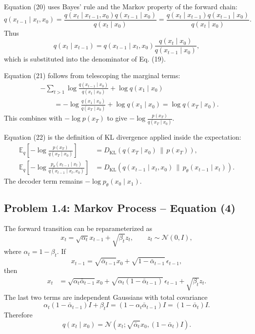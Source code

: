 \documentclass[11pt]{article}
\newcommand{\E}{\mathbb{E}}
\newcommand{\N}{\mathcal{N}}
\newcommand{\KL}{D_{\mathrm{KL}}}
\newcommand{\Id}{I}
\begin{document}
Equation (20) uses Bayes' rule and the Markov property of the forward chain:
\[
q(x_{t-1}\mid x_t,x_0)
=\frac{q(x_t\mid x_{t-1},x_0)q(x_{t-1}\mid x_0)}{q(x_t\mid x_0)}
=\frac{q(x_t\mid x_{t-1})q(x_{t-1}\mid x_0)}{q(x_t\mid x_0)}.
\]
Thus
\[
q(x_t\mid x_{t-1})
=q(x_{t-1}\mid x_t,x_0)\frac{q(x_t\mid x_0)}{q(x_{t-1}\mid x_0)},
\]
which is substituted into the denominator of Eq. (19).

Equation (21) follows from telescoping the marginal terms:
\begin{align*}
&-\sum_{t>1}\log \frac{q(x_{t-1}\mid x_0)}{q(x_t\mid x_0)}
+\log q(x_1\mid x_0) \\
&\qquad
=-\log\frac{q(x_1\mid x_0)}{q(x_T\mid x_0)}
+\log q(x_1\mid x_0)
=\log q(x_T\mid x_0).
\end{align*}
This combines with $-\log p(x_T)$ to give $-\log \frac{p(x_T)}{q(x_T\mid x_0)}$.

Equation (22) is the definition of KL divergence applied inside the expectation:
\begin{align*}
\E_q\left[-\log \frac{p(x_T)}{q(x_T\mid x_0)}\right]
&= \KL(q(x_T\mid x_0)\,\|\,p(x_T)),\\
\E_q\left[-\log
\frac{p_\theta(x_{t-1}\mid x_t)}
{q(x_{t-1}\mid x_t,x_0)}\right]
&= \KL(q(x_{t-1}\mid x_t,x_0)\,\|\,p_\theta(x_{t-1}\mid x_t)).
\end{align*}
The decoder term remains $-\log p_\theta(x_0\mid x_1)$.

\subsection*{Problem 1.4: Markov Process -- Equation (4)}
The forward transition can be reparameterized as
\[
x_t=\sqrt{\alpha_t}x_{t-1}+\sqrt{\beta_t}z_t,\qquad z_t\sim\N(0,\Id),
\]
where $\alpha_t=1-\beta_t$.  If
\[
x_{t-1}=\sqrt{\bar\alpha_{t-1}}x_0+\sqrt{1-\bar\alpha_{t-1}}\,\epsilon_{t-1},
\]
then
\begin{align*}
x_t
&=\sqrt{\alpha_t\bar\alpha_{t-1}}x_0
+\sqrt{\alpha_t(1-\bar\alpha_{t-1})}\,\epsilon_{t-1}
+\sqrt{\beta_t}z_t.
\end{align*}
The last two terms are independent Gaussians with total covariance
\[
\alpha_t(1-\bar\alpha_{t-1})\Id+\beta_t\Id
=(1-\alpha_t\bar\alpha_{t-1})\Id
=(1-\bar\alpha_t)\Id.
\]
Therefore
\[
q(x_t\mid x_0)=\N\left(x_t;\sqrt{\bar\alpha_t}x_0,(1-\bar\alpha_t)\Id\right).
\]
\end{document}

